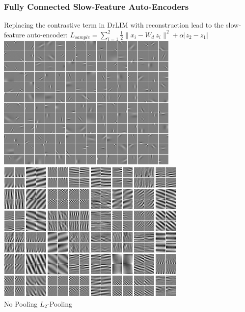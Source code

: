 \documentclass{beamer}
\begin{document}
\begin{frame} 
\frametitle{Fully Connected Slow-Feature Auto-Encoders} 
Replacing the contrastive term in DrLIM with reconstruction lead to the slow-feature auto-encoder: 
\center
$L_{sample} = \sum_{i=1} ^2 \frac{1}{2}\|x_i - W_d~z_i\|^2 +\alpha|z_2 - z_1|$ \\ \vspace{0.5cm} 
\includegraphics[scale=0.4]{./figures/SF.png} \hspace{0.5cm} 
\includegraphics[scale=0.385]{./figures/fourier.png}\\
\hspace{1.5cm} No Pooling \hspace{3.5cm} $L_2$-Pooling
\end{frame} 
\end{document}
